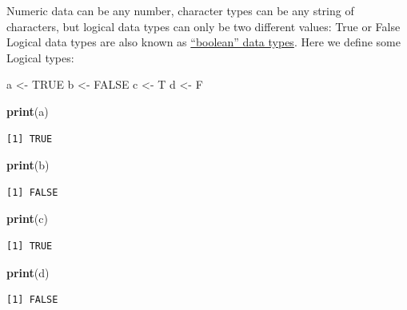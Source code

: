 \documentclass[
]{book}
\newenvironment{Shaded}{\begin{snugshade}}{\end{snugshade}}
\newcommand{\KeywordTok}[1]{\textcolor[rgb]{0.13,0.29,0.53}{\textbf{#1}}}
\newcommand{\NormalTok}[1]{#1}
\newcommand{\OtherTok}[1]{\textcolor[rgb]{0.56,0.35,0.01}{#1}}
\newcommand{\StringTok}[1]{\textcolor[rgb]{0.31,0.60,0.02}{#1}}
\begin{document}
Numeric data can be any number, character types can be any string of characters, but logical data types can only be two different values: True or False
Logical data types are also known as \href{https://en.wikipedia.org/wiki/Boolean_data_type}{``boolean'' data types}.
Here we define some Logical types:

\begin{Shaded}
\begin{Highlighting}[]
\NormalTok{a <-}\StringTok{ }\OtherTok{TRUE}
\NormalTok{b <-}\StringTok{ }\OtherTok{FALSE}
\NormalTok{c <-}\StringTok{ }\NormalTok{T}
\NormalTok{d <-}\StringTok{ }\NormalTok{F}
\end{Highlighting}
\end{Shaded}

\begin{Shaded}
\begin{Highlighting}[]
\KeywordTok{print}\NormalTok{(a)}
\end{Highlighting}
\end{Shaded}

\begin{verbatim}
[1] TRUE
\end{verbatim}

\begin{Shaded}
\begin{Highlighting}[]
\KeywordTok{print}\NormalTok{(b)}
\end{Highlighting}
\end{Shaded}

\begin{verbatim}
[1] FALSE
\end{verbatim}

\begin{Shaded}
\begin{Highlighting}[]
\KeywordTok{print}\NormalTok{(c)}
\end{Highlighting}
\end{Shaded}

\begin{verbatim}
[1] TRUE
\end{verbatim}

\begin{Shaded}
\begin{Highlighting}[]
\KeywordTok{print}\NormalTok{(d)}
\end{Highlighting}
\end{Shaded}

\begin{verbatim}
[1] FALSE
\end{verbatim}
\end{document}
